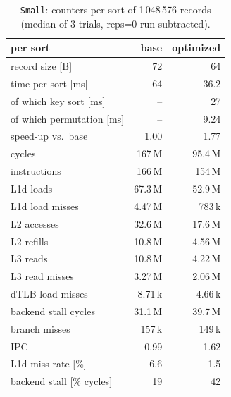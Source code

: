 \begin{table}[htbp]\centering\small
\begin{tabular}{lrr}
\toprule
per sort & base & optimized \\
\midrule
record size [B] & 72 & 64 \\
time per sort [ms] & 64 & 36.2 \\
\quad of which key sort [ms] & -- & 27 \\
\quad of which permutation [ms] & -- & 9.24 \\
speed-up vs.\ base & 1.00 & 1.77 \\
cycles & 167\,M & 95.4\,M \\
instructions & 166\,M & 154\,M \\
L1d loads & 67.3\,M & 52.9\,M \\
L1d load misses & 4.47\,M & 783\,k \\
L2 accesses & 32.6\,M & 17.6\,M \\
L2 refills & 10.8\,M & 4.56\,M \\
L3 reads & 10.8\,M & 4.22\,M \\
L3 read misses & 3.27\,M & 2.06\,M \\
dTLB load misses & 8.71\,k & 4.66\,k \\
backend stall cycles & 31.1\,M & 39.7\,M \\
branch misses & 157\,k & 149\,k \\
IPC & 0.99 & 1.62 \\
L1d miss rate [\%] & 6.6 & 1.5 \\
backend stall [\% cycles] & 19 & 42 \\
\bottomrule
\end{tabular}
\caption{\texttt{Small}: counters per sort of 1\,048\,576 records (median of 3 trials, reps=0 run subtracted).}\label{tab:small1048576}
\end{table}
